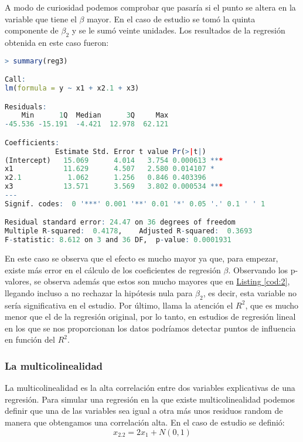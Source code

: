 \documentclass[12pt,a4paper]{article}
\begin{document}
A modo de curiosidad podemos comprobar que pasaría si el punto se altera en la variable que tiene el $\beta$ mayor. En el caso de estudio se tomó la quinta componente de $\beta_2$ y se le sumó veinte unidades. Los resultados de la regresión obtenida en este caso fueron:
\begin{lstlisting}[language=R, caption = Regresión lineal con un punto de influencia, label =cod:4]
> summary(reg3)

Call:
lm(formula = y ~ x1 + x2.1 + x3)

Residuals:
    Min      1Q  Median      3Q     Max 
-45.536 -15.191  -4.421  12.978  62.121 

Coefficients:
            Estimate Std. Error t value Pr(>|t|)    
(Intercept)   15.069      4.014   3.754 0.000613 ***
x1            11.629      4.507   2.580 0.014107 *  
x2.1           1.062      1.256   0.846 0.403396    
x3            13.571      3.569   3.802 0.000534 ***
---
Signif. codes:  0 '***' 0.001 '**' 0.01 '*' 0.05 '.' 0.1 ' ' 1

Residual standard error: 24.47 on 36 degrees of freedom
Multiple R-squared:  0.4178,	Adjusted R-squared:  0.3693 
F-statistic: 8.612 on 3 and 36 DF,  p-value: 0.0001931
\end{lstlisting}
En este caso se observa que el efecto es mucho mayor ya que, para empezar, existe más error en el cálculo de los coeficientes de regresión $\beta$. Observando los p-valores, se observa además que estos son mucho mayores que en \hyperref[cod:2]{Listing \ref{cod:2}}, llegando incluso a no rechazar la hipótesis nula para $\beta_2$, es decir, esta variable no sería significativa en el estudio. Por último, llama la atención el $R^2$, que es mucho menor que el de la regresión original, por lo tanto, en estudios de regresión lineal en los que se nos proporcionan los datos podríamos detectar puntos de influencia en función del $R^2$.

\subsubsection{La multicolinealidad}
La multicolinealidad es la alta correlación entre dos variables explicativas de una regresión. Para simular una regresión en la que existe multicolinealidad podemos definir que una de las variables sea igual a otra más unos residuos random de manera que obtengamos una correlación alta. En el caso de estudio se definió:
\begin{equation*}
    x_{2.2} = 2x_1 + N(0,1)
\end{equation*}
\end{document}
